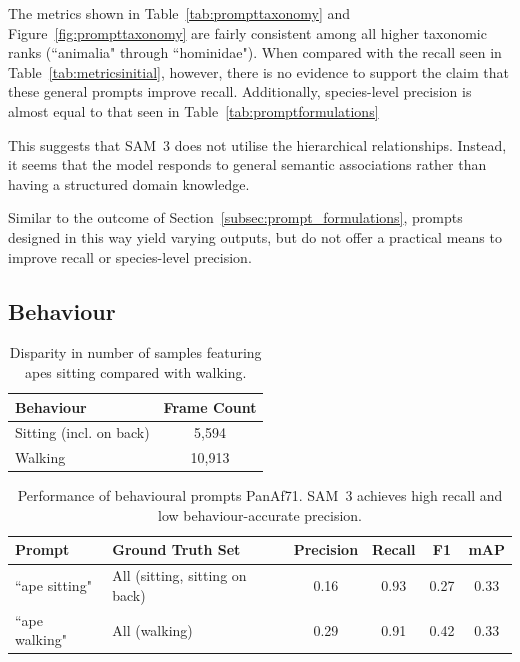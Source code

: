 \documentclass[author={Jacob Stephenson},
    degree={BSc},
    title={Robust Great Ape Species Detection in Wild Camera Trap Imagery with Promptable Concept Segmentation},
    unit={COMS30045},
    subtitle={}]{dissertation}
\begin{document}
The metrics shown in Table~\ref{tab:prompttaxonomy} and Figure~\ref{fig:prompttaxonomy} are fairly consistent among all higher taxonomic ranks (``animalia" through ``hominidae"). When compared with the recall seen in Table~\ref{tab:metricsinitial}, however, there is no evidence to support the claim that these general prompts improve recall. Additionally, species-level precision is almost equal to that seen in Table~\ref{tab:promptformulations}

This suggests that SAM~3 does not utilise the hierarchical relationships. Instead, it seems that the model responds to general semantic associations rather than having a structured domain knowledge.

Similar to the outcome of Section~\ref{subsec:prompt_formulations}, prompts designed in this way yield varying outputs, but do not offer a practical means to improve recall or species-level precision.

\subsection{Behaviour}
\label{sec:prompt_behaviour}

\begin{table}[H]
    \centering

    \begin{tabular}{l|c}
        \toprule
        \textbf{Behaviour} & \textbf{Frame Count} \\
        \midrule
        Sitting (incl. on back) & 5,594 \\
        Walking & 10,913 \\
        \bottomrule
    \end{tabular}

    \caption[Dataset Behaviour Count Splits]{Disparity in number of samples featuring apes sitting compared with walking.}
    \label{tab:behaviourcounts}
\end{table}

\begin{table}[H]
    \centering
    
    \begin{tabular}{ll|cccc}
        \toprule

        \textbf{Prompt} & \textbf{Ground Truth Set} & \textbf{Precision} & \textbf{Recall} & \textbf{F1} & \textbf{mAP} \\

        \midrule

        ``ape sitting" & All (sitting, sitting on back) & 0.16 & 0.93 & 0.27 & 0.33 \\

        ``ape walking" & All (walking) & 0.29 & 0.91 & 0.42 & 0.33 \\

        \bottomrule
    \end{tabular}

    \caption[Behavioural prompts]{Performance of behavioural prompts PanAf71. SAM~3 achieves high recall and low behaviour-accurate precision.}
    \label{tab:promptbehaviour}
\end{table}
\end{document}
